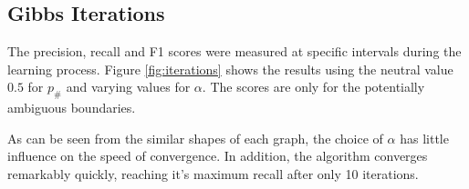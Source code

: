 \documentclass[11pt]{article}
\begin{document}
\subsection{Gibbs Iterations}
\FloatBarrier
The precision, recall and F1 scores were measured at specific intervals during
the learning process. Figure \ref{fig:iterations} shows the results using the
neutral value $0.5$ for $p_\#$ and varying values for $\alpha$. The scores are
only for the potentially ambiguous boundaries.

As can be seen from the similar shapes of each graph, the choice of $\alpha$ has
little influence on the speed of convergence. In addition, the algorithm
converges remarkably quickly, reaching it's maximum recall after only 10
iterations.
\begin{figure}[h!]
  \centering



\end{figure}
\end{document}
